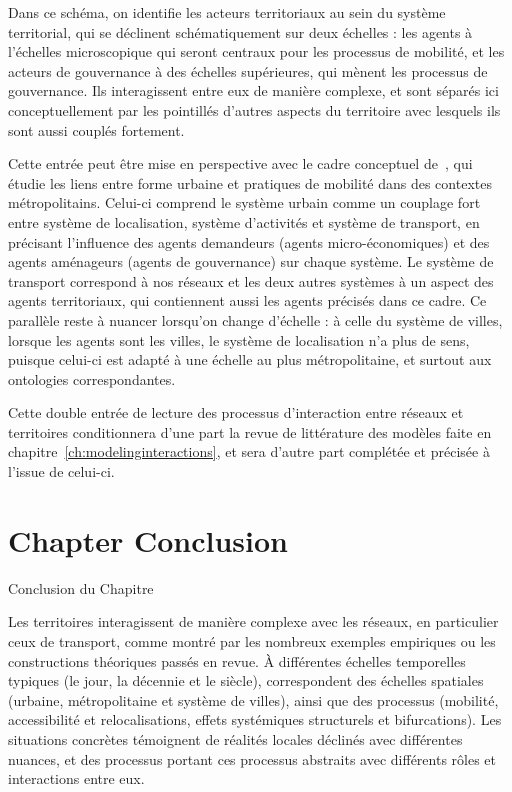 Dans ce schéma, on identifie les acteurs territoriaux au sein du système territorial, qui se déclinent schématiquement sur deux échelles : les agents à l'échelles microscopique qui seront centraux pour les processus de mobilité, et les acteurs de gouvernance à des échelles supérieures, qui mènent les processus de gouvernance. Ils interagissent entre eux de manière complexe, et sont séparés ici conceptuellement par les pointillés d'autres aspects du territoire avec lesquels ils sont aussi couplés fortement.


Cette entrée peut être mise en perspective avec le cadre conceptuel de~\cite{le2010approche}, qui étudie les liens entre forme urbaine et pratiques de mobilité dans des contextes métropolitains. Celui-ci comprend le système urbain comme un couplage fort entre système de localisation, système d'activités et système de transport, en précisant l'influence des agents demandeurs (agents micro-économiques) et des agents aménageurs (agents de gouvernance) sur chaque système. Le système de transport correspond à nos réseaux et les deux autres systèmes à un aspect des agents territoriaux, qui contiennent aussi les agents précisés dans ce cadre. Ce parallèle reste à nuancer lorsqu'on change d'échelle : à celle du système de villes, lorsque les agents sont les villes, le système de localisation n'a plus de sens, puisque celui-ci est adapté à une échelle au plus métropolitaine, et surtout aux ontologies correspondantes.


\bigskip

Cette double entrée de lecture des processus d'interaction entre réseaux et territoires conditionnera d'une part la revue de littérature des modèles faite en chapitre~\ref{ch:modelinginteractions}, et sera d'autre part complétée et précisée à l'issue de celui-ci.



\stars




\newpage


\section*{Chapter Conclusion}{Conclusion du Chapitre}




Les territoires interagissent de manière complexe avec les réseaux, en particulier ceux de transport, comme montré par les nombreux exemples empiriques ou les constructions théoriques passés en revue. À différentes échelles temporelles typiques (le jour, la décennie et le siècle), correspondent des échelles spatiales (urbaine, métropolitaine et système de villes), ainsi que des processus (mobilité, accessibilité et relocalisations, effets systémiques structurels et bifurcations). Les situations concrètes témoignent de réalités locales déclinés avec différentes nuances, et des processus portant ces processus abstraits avec différents rôles et interactions entre eux.

